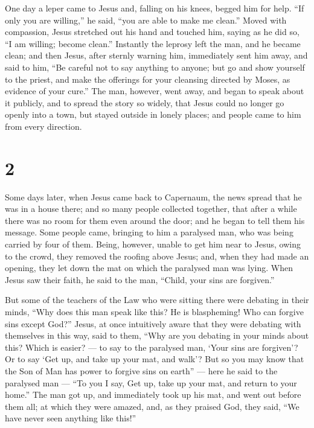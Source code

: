  One day a leper came to Jesus and, falling on his knees,
begged him for help. ``If only you are willing,'' he said, ``you are
able to make me clean.''  Moved with compassion, Jesus
stretched out his hand and touched him, saying as he did so, ``I am
willing; become clean.''  Instantly the leprosy left the
man, and he became clean;  and then Jesus, after sternly
warning him, immediately sent him away, and said to him, 
``Be careful not to say anything to anyone; but go and show yourself to
the priest, and make the offerings for your cleansing directed by Moses,
as evidence of your cure.''  The man, however, went away,
and began to speak about it publicly, and to spread the story so widely,
that Jesus could no longer go openly into a town, but stayed outside in
lonely places; and people came to him from every direction.

\hypertarget{section-1}{%
\section{2}\label{section-1}}

 Some days later, when Jesus came back to Capernaum, the
news spread that he was in a house there;  and so many
people collected together, that after a while there was no room for them
even around the door; and he began to tell them his message.
 Some people came, bringing to him a paralysed man, who was
being carried by four of them.  Being, however, unable to
get him near to Jesus, owing to the crowd, they removed the roofing
above Jesus; and, when they had made an opening, they let down the mat
on which the paralysed man was lying.  When Jesus saw their
faith, he said to the man, ``Child, your sins are forgiven.''

 But some of the teachers of the Law who were sitting there
were debating in their minds,  ``Why does this man speak
like this? He is blaspheming! Who can forgive sins except God?''
 Jesus, at once intuitively aware that they were debating
with themselves in this way, said to them, ``Why are you debating in
your minds about this?  Which is easier? --- to say to the
paralysed man, `Your sins are forgiven'? Or to say `Get up, and take up
your mat, and walk'?  But so you may know that the Son of
Man has power to forgive sins on earth'' --- here he said to the
paralysed man ---  ``To you I say, Get up, take up your
mat, and return to your home.''  The man got up, and
immediately took up his mat, and went out before them all; at which they
were amazed, and, as they praised God, they said, ``We have never seen
anything like this!''


